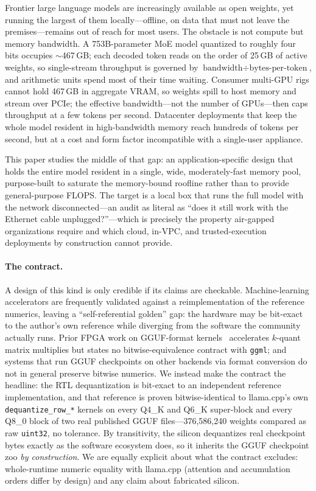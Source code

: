 \documentclass[11pt]{article}
\newcommand{\code}[1]{\texttt{#1}}
\begin{document}
Frontier large language models are increasingly available as open weights, yet
running the largest of them locally---offline, on data that must not leave the
premises---remains out of reach for most users. The obstacle is not compute but
memory bandwidth. A 753B-parameter MoE model quantized to roughly four bits
occupies $\sim$467\,GB; each decoded token reads on the order of 25\,GB of
active weights, so single-stream throughput is governed by
$\text{bandwidth} \div \text{bytes-per-token}$, and arithmetic units spend most
of their time waiting. Consumer multi-GPU rigs cannot hold 467\,GB in aggregate
VRAM, so weights spill to host memory and stream over PCIe; the effective
bandwidth---not the number of GPUs---then caps throughput at a few tokens per
second. Datacenter deployments that keep the whole model resident in
high-bandwidth memory reach hundreds of tokens per second, but at a cost and
form factor incompatible with a single-user appliance.

This paper studies the middle of that gap: an application-specific design that
holds the entire model resident in a single, wide, moderately-fast memory pool,
purpose-built to saturate the memory-bound roofline rather than to provide
general-purpose FLOPS. The target is a local box that runs the full model with
the network disconnected---an audit as literal as ``does it still work with the
Ethernet cable unplugged?''---which is precisely the property air-gapped
organizations require and which cloud, in-VPC, and trusted-execution deployments
by construction cannot provide.

\paragraph{The contract.} A design of this kind is only credible if its claims
are checkable. Machine-learning accelerators are frequently validated against a
reimplementation of the reference numerics, leaving a ``self-referential
golden'' gap: the hardware may be bit-exact to the author's own reference while
diverging from the software the community actually runs. Prior FPGA work on
GGUF-format kernels~\cite{secdallm,fbfq} accelerates $k$-quant matrix
multiplies but states no bitwise-equivalence contract with \code{ggml}; and
systems that run GGUF checkpoints on other backends via format conversion do
not in general preserve bitwise numerics. We instead make the contract the
headline: the RTL dequantization
is bit-exact to an independent reference implementation, and that reference is
proven bitwise-identical to llama.cpp's own \code{dequantize\_row\_*} kernels
on every Q4\_K and Q6\_K super-block and every Q8\_0 block of two real
published GGUF files---376{,}586{,}240 weights compared as raw \code{uint32},
no tolerance. By transitivity, the silicon dequantizes real checkpoint bytes
exactly as the software ecosystem does, so it inherits the GGUF checkpoint zoo
\emph{by construction}.
We are equally explicit about what the contract excludes: whole-runtime numeric
equality with llama.cpp (attention and accumulation orders differ by design)
and any claim about fabricated silicon.
\end{document}
